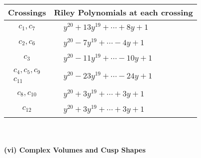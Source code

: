 \documentclass[1p]{elsarticle_modified}
\theoremstyle{definition}
\begin{document}
\begin{tabular}{m{50pt}|m{274pt}}
Crossings & \hspace{64pt}Riley Polynomials at each crossing \\
\hline $$\begin{aligned}c_{1},c_{7}\end{aligned}$$&$\begin{aligned}
&y^{20}+13 y^{19}+\cdots+8 y+1
\end{aligned}$\\
\hline $$\begin{aligned}c_{2},c_{6}\end{aligned}$$&$\begin{aligned}
&y^{20}-7 y^{19}+\cdots-4 y+1
\end{aligned}$\\
\hline $$\begin{aligned}c_{3}\end{aligned}$$&$\begin{aligned}
&y^{20}-11 y^{19}+\cdots-10 y+1
\end{aligned}$\\
\hline $$\begin{aligned}c_{4},c_{5},c_{9}\\c_{11}\end{aligned}$$&$\begin{aligned}
&y^{20}-23 y^{19}+\cdots-24 y+1
\end{aligned}$\\
\hline $$\begin{aligned}c_{8},c_{10}\end{aligned}$$&$\begin{aligned}
&y^{20}+3 y^{19}+\cdots+3 y+1
\end{aligned}$\\
\hline $$\begin{aligned}c_{12}\end{aligned}$$&$\begin{aligned}
&y^{20}+3 y^{19}+\cdots+3 y+1
\end{aligned}$\\
\hline
\end{tabular}\\~\\
\newpage\flushleft \textbf{(vi) Complex Volumes and Cusp Shapes}
\end{document}
